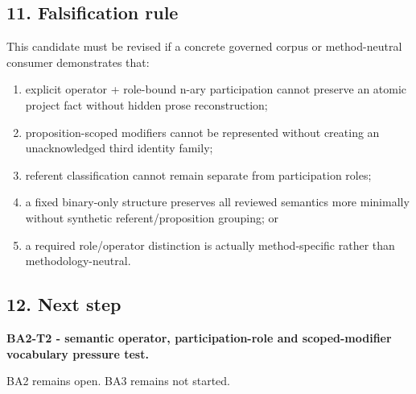 \documentclass[
  10pt,
  letterpaper,
]{article}
\providecommand{\tightlist}{%
  \setlength{\itemsep}{0pt}\setlength{\parskip}{0pt}}
\begin{document}
\subsection{11. Falsification rule}\label{falsification-rule}

This candidate must be revised if a concrete governed corpus or
method-neutral consumer demonstrates that:

\begin{enumerate}
\def\labelenumi{\arabic{enumi}.}
\tightlist
\item
  explicit operator + role-bound n-ary participation cannot preserve an
  atomic project fact without hidden prose reconstruction;
\item
  proposition-scoped modifiers cannot be represented without creating an
  unacknowledged third identity family;
\item
  referent classification cannot remain separate from participation
  roles;
\item
  a fixed binary-only structure preserves all reviewed semantics more
  minimally without synthetic referent/proposition grouping; or
\item
  a required role/operator distinction is actually method-specific
  rather than methodology-neutral.
\end{enumerate}

\subsection{12. Next step}\label{next-step}

\textbf{BA2-T2 - semantic operator, participation-role and
scoped-modifier vocabulary pressure test.}

BA2 remains open. BA3 remains not started.
\end{document}
